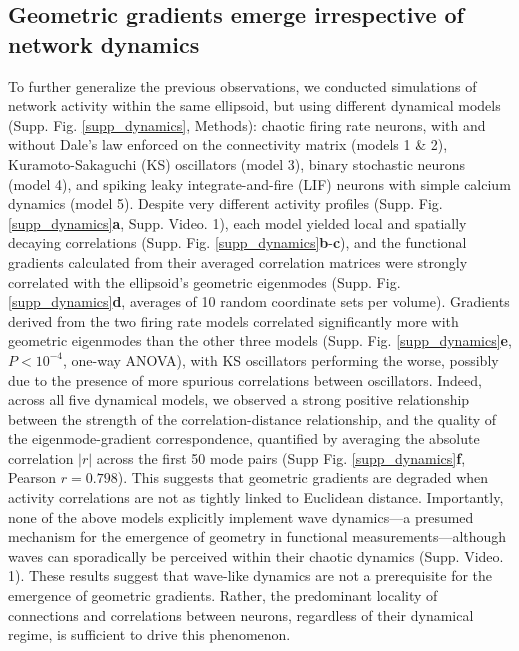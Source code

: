 \documentclass{article}
\begin{document}
\subsection*{Geometric gradients emerge irrespective of network dynamics}

To further generalize the previous observations, we conducted simulations of network activity within the same ellipsoid, but using different dynamical models (Supp. Fig. \ref{supp_dynamics}, Methods): chaotic firing rate neurons\cite{sompolinsky1988chaos, rajan2010stimulus}, with and without Dale's law enforced on the connectivity matrix (models 1 \& 2), Kuramoto-Sakaguchi (KS) oscillators\cite{sakaguchi1986soluble} (model 3), binary stochastic neurons (model 4), and spiking leaky integrate-and-fire (LIF) neurons with simple calcium dynamics\cite{izhikevich2007dynamical} (model 5). Despite very different activity profiles (Supp. Fig. \ref{supp_dynamics}\textbf{a}, Supp. Video. 1), each model yielded local and spatially decaying correlations (Supp. Fig. \ref{supp_dynamics}\textbf{b}-\textbf{c}), and the functional gradients calculated from their averaged correlation matrices were strongly correlated with the ellipsoid's geometric eigenmodes (Supp. Fig. \ref{supp_dynamics}\textbf{d}, averages of 10 random coordinate sets per volume). Gradients derived from the two firing rate models correlated significantly more with geometric eigenmodes than the other three models (Supp. Fig. \ref{supp_dynamics}\textbf{e}, $P<10^{-4}$, one-way ANOVA), with KS oscillators performing the worse, possibly due to the presence of more spurious correlations between oscillators. Indeed, across all five dynamical models, we observed a strong positive relationship between the strength of the correlation-distance relationship, and the quality of the eigenmode-gradient correspondence, quantified by averaging the absolute correlation $|r|$ across the first 50 mode pairs (Supp Fig. \ref{supp_dynamics}\textbf{f}, Pearson $r=0.798$). This suggests that geometric gradients are degraded when activity correlations are not as tightly linked to Euclidean distance. Importantly, none of the above models explicitly implement wave dynamics---a presumed mechanism for the emergence of geometry in functional measurements\cite{pang2023geometric}---although waves can sporadically be perceived within their chaotic dynamics (Supp. Video. 1). These results suggest that wave-like dynamics are not a prerequisite for the emergence of geometric gradients. Rather, the predominant locality of connections and correlations between neurons, regardless of their dynamical regime, is sufficient to drive this phenomenon.
\end{document}
